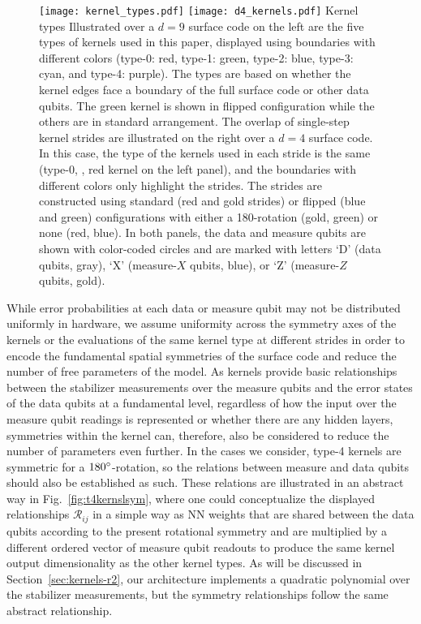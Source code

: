 \begin{figure*}[htb]
\centering
\texttt{[image: kernel\_types.pdf]}
\texttt{[image: d4\_kernels.pdf]}
\ccaption
{Kernel types}
{
Illustrated over a $d=9$ surface code on the left are the five types of kernels used in this paper, displayed using boundaries with different colors (type-0: red, type-1: green, type-2: blue, type-3: cyan, and type-4: purple). The types are based on whether the kernel edges face a boundary of the full surface code or other data qubits. The green kernel is shown in flipped configuration while the others are in standard arrangement.
The overlap of single-step kernel strides are illustrated on the right over a $d=4$ surface code. In this case, the type of the kernels used in each stride is the same (type-0, \ie, red kernel on the left panel), and the boundaries with different colors only highlight the strides. The strides are constructed using standard (red and gold strides) or flipped (blue and green) configurations with either a 180\degrees{}-rotation (gold, green) or none (red, blue).
In both panels, the data and measure qubits are shown with color-coded circles and are marked with letters `D' (data qubits, gray), `X' (measure-$X$ qubits, blue), or `Z' (measure-$Z$ qubits, gold).
}
\label{fig:ktypes}
\end{figure*}

While error probabilities at each data or measure qubit may not be distributed uniformly in hardware, we assume uniformity across the symmetry axes of the kernels or the evaluations of the same kernel type at different strides in order to encode the fundamental spatial symmetries of the surface code and reduce the number of free parameters of the model. As kernels provide basic relationships between the stabilizer measurements over the measure qubits and the error states of the data qubits at a fundamental level, regardless of how the input over the measure qubit readings is represented or whether there are any hidden layers, symmetries within the kernel can, therefore, also be considered to reduce the number of parameters even further. In the cases we consider, type-4 kernels are symmetric for a $180^\circ$-rotation, so the relations between measure and data qubits should also be established as such. These relations are illustrated in an abstract way in Fig.~\ref{fig:t4kernslsym}, where one could conceptualize the displayed relationships $\mathcal{R}_{ij}$ in a simple way as NN weights that are shared between the data qubits according to the present rotational symmetry and are multiplied by a different ordered vector of measure qubit readouts to produce the same kernel output dimensionality as the other kernel types. As will be discussed in Section~\ref{sec:kernels-r2}, our architecture implements a quadratic polynomial over the stabilizer measurements, but the symmetry relationships follow the same abstract relationship.


